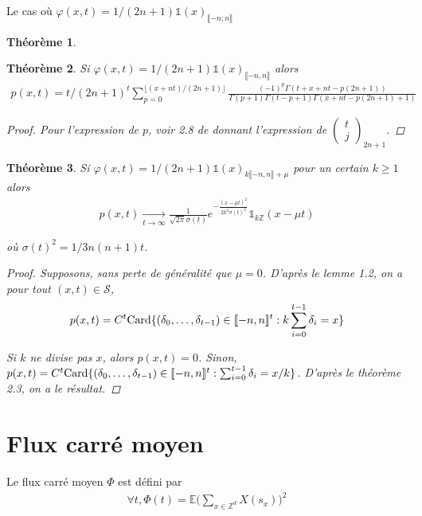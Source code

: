 \documentclass{article}
\newtheorem{theorem}{Théorème}[section]
\theoremstyle{definition}
\begin{document}
\begin{section}{Le cas où $\varphi(x, t) = 1/(2n+1)\mathds{1}(x)_{\llbracket -n; n\rrbracket}$}
\begin{theorem}
\end{theorem}
\begin{theorem}
	Si $\varphi(x,t) =1/(2n+1) \mathds{1}(x)_{\llbracket -n,n\rrbracket}$ alors
	\begin{align*}
		p(x,t) = t/(2n+1)^t\sum_{p=0}^{\lfloor (x+nt)/(2n+1)\rfloor} \frac{(-1)^p\Gamma(t+x+nt-p(2n+1))}{\Gamma(p+1)\Gamma(t-p+1)\Gamma(x+nt-p(2n+1)+1)}
	\end{align*}
	\begin{proof}
		Pour l'expression de $p$, voir 2.8 de \cite{h2} donnant l'expression de $\begin{pmatrix} t\\j\end{pmatrix}_{2n+1}$. 
	\end{proof}
\end{theorem}
\begin{theorem}
	Si $\varphi(x,t) = 1/(2n+1)\mathds{1}(x)_{k\llbracket -n,n\rrbracket+\mu}$ pour un certain $k\geq 1$ alors
	\begin{align*}
		p(x,t) \underset{t\to \infty}{\to} \frac{1}{\sqrt{2\pi}\sigma(t)} e^{-\frac{(x-\mu t)^2}{2k^2\sigma(t)^2}}\mathds{1}_{k\mathbb{Z}}(x-\mu t) 
	\end{align*}

	où $\sigma(t)^2 = 1/3n(n+1)t$.
	\begin{proof}
		Supposons, sans perte de généralité que $\mu = 0$. D'après le lemme 1.2, on a pour tout $(x,t)\in \mathcal{S}$, 
		\begin{align*}
			p(x,t) = C^t\textup{Card}\{(\delta_0, \ldots, \delta_{t-1}) \in \llbracket -n,n\rrbracket^t : k\sum_{i=0}^{t-1}\delta_i = x\}
		\end{align*}

		Si $k$ ne divise pas $x$, alors $p(x,t) = 0$. Sinon, $p(x,t) = C^t\textup{Card}\{(\delta_0, \ldots, \delta_{t-1})\in\llbracket -n,n\rrbracket^t : \sum_{i=0}^{t-1}\delta_i = x/k\}$. D'après le théorème 2.3, on a le résultat.
	\end{proof}
\end{theorem}
\end{section}
\section{Flux carré moyen}
Le flux carré moyen $\Phi$ est défini par 
\begin{align*}
	\forall t, \Phi(t) = \mathbb{E}\bigg(\sum_{x\in\mathbb{Z}^d}X(s_x)\bigg)^2 
\end{align*}
\end{document}
